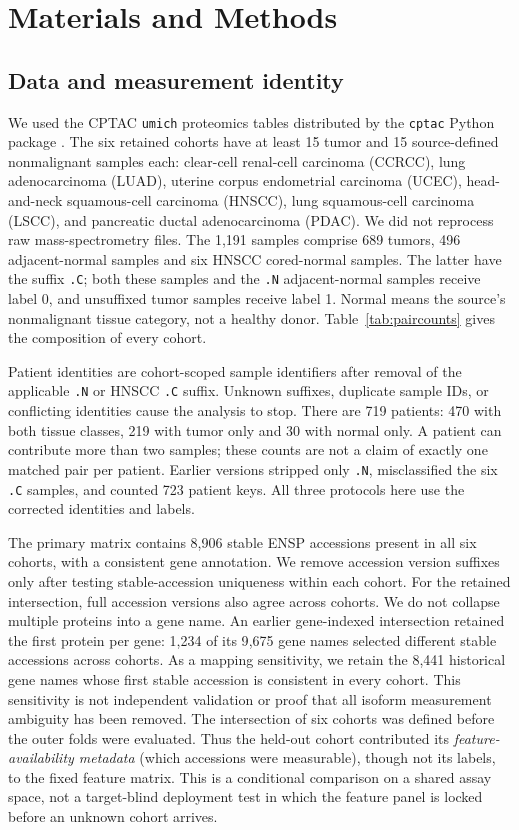 \section{Materials and Methods}

\subsection{Data and measurement identity}

We used the CPTAC \texttt{umich} proteomics tables distributed by the
\texttt{cptac} Python package \citep{cptacPkg}. The six retained cohorts have
at least 15 tumor and 15 source-defined nonmalignant samples each:
clear-cell renal-cell carcinoma (CCRCC), lung adenocarcinoma (LUAD), uterine
corpus endometrial carcinoma (UCEC), head-and-neck squamous-cell carcinoma
(HNSCC), lung squamous-cell carcinoma (LSCC), and pancreatic ductal
adenocarcinoma (PDAC). We did not reprocess raw mass-spectrometry files.
The 1{,}191 samples comprise 689 tumors, 496 adjacent-normal samples
and six HNSCC cored-normal samples. The latter have the suffix \texttt{.C};
both these samples and the \texttt{.N} adjacent-normal samples receive label
0, and unsuffixed tumor samples receive label 1. Normal means the source's
nonmalignant tissue category, not a healthy donor. Table~\ref{tab:paircounts}
gives the composition of every cohort.

Patient identities are cohort-scoped sample identifiers after removal of
the applicable \texttt{.N} or HNSCC \texttt{.C} suffix. Unknown suffixes,
duplicate sample IDs, or conflicting identities cause the analysis to
stop. There are 719 patients: 470 with both tissue classes, 219 with tumor
only and 30 with normal only. A patient can contribute more than two
samples; these counts are not a claim of exactly one matched pair per
patient. Earlier versions stripped only \texttt{.N}, misclassified the six
\texttt{.C} samples, and counted 723 patient keys. All three protocols here
use the corrected identities and labels.

The primary matrix contains 8{,}906 stable ENSP accessions present in all
six cohorts, with a consistent gene annotation. We remove accession
version suffixes only after testing stable-accession uniqueness within
each cohort. For the retained intersection, full accession versions also
agree across cohorts. We do not collapse multiple proteins into a gene
name. An earlier gene-indexed intersection retained the first protein per
gene: 1{,}234 of its 9{,}675 gene names selected different stable accessions
across cohorts. As a mapping sensitivity, we retain the 8{,}441 historical
gene names whose first stable accession is consistent in every cohort.
This sensitivity is not independent validation or proof that all isoform
measurement ambiguity has been removed. The intersection of six cohorts was
defined before the outer folds were evaluated. Thus the held-out cohort
contributed its \emph{feature-availability metadata} (which accessions
were measurable), though not its labels, to the fixed feature matrix.
This is a conditional comparison on a shared assay space, not a target-blind
deployment test in which the feature panel is locked before an unknown
cohort arrives.


